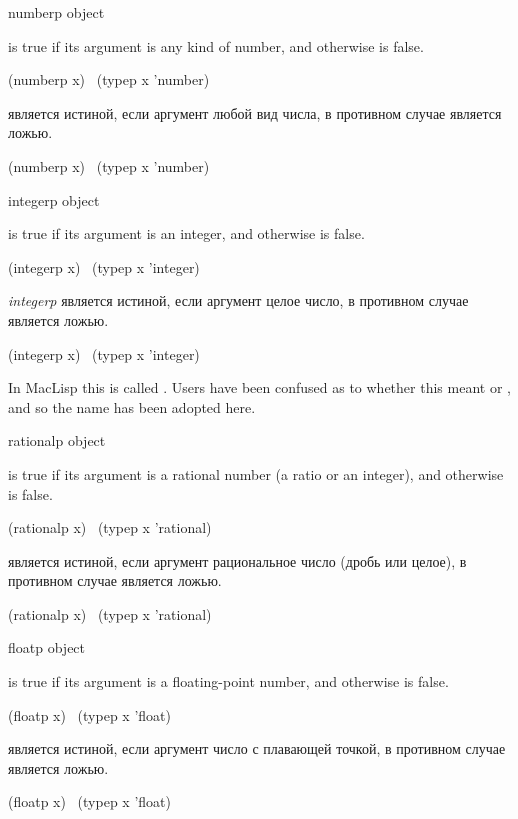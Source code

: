\begin{defun}[Function]
numberp object

 is true if its argument is any kind of number,
and otherwise is false.
\begin{lisp}
(numberp x) \EQ\ (typep x 'number)
\end{lisp}

 является истиной, если аргумент любой вид числа, в
противном случае является ложью.
\begin{lisp}
(numberp x) \EQ\ (typep x 'number)
\end{lisp}
\end{defun}

\begin{defun}[Function]
integerp object

 is true if its argument is an integer, and otherwise
is false.
\begin{lisp}
(integerp x) \EQ\ (typep x 'integer)
\end{lisp}

\emph{integerp} является истиной, если аргумент целое число, в противном
случае является ложью.
\begin{lisp}
(integerp x) \EQ\ (typep x 'integer)
\end{lisp}

\beforenoterule
\begin{incompatibility}
In MacLisp this is called .
Users have been confused as to whether this meant 
or , and so the name  has been adopted here.
\end{incompatibility}
\afternoterule
\end{defun}

\begin{defun}[Function]
rationalp object

 is true if its argument is a rational number (a ratio or
an integer), and otherwise is false.
\begin{lisp}
(rationalp x) \EQ\ (typep x 'rational)
\end{lisp}

 является истиной, если аргумент рациональное число (дробь или
целое), в противном случае является ложью.
\begin{lisp}
(rationalp x) \EQ\ (typep x 'rational)
\end{lisp}
\end{defun}

\begin{defun}[Function]
floatp object

 is true if its argument is a floating-point number,
and otherwise is false.
\begin{lisp}
(floatp x) \EQ\ (typep x 'float)
\end{lisp}
 является истиной, если аргумент число с плавающей точкой, в
противном случае является ложью.
\begin{lisp}
(floatp x) \EQ\ (typep x 'float)
\end{lisp}
\end{defun}


